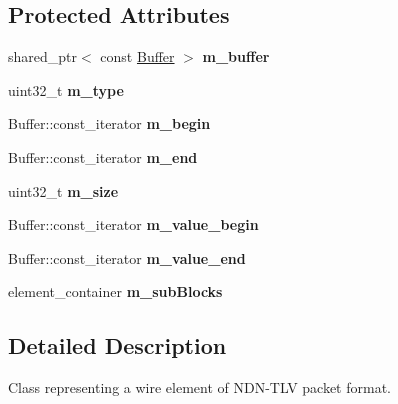 \subsection*{Protected Attributes}
\begin{DoxyCompactItemize}
\item 
shared\+\_\+ptr$<$ const \hyperlink{classndn_1_1Buffer}{Buffer} $>$ {\bfseries m\+\_\+buffer}\hypertarget{classndn_1_1Block_ac0023f090d7234a775c4302ba23de184}{}\label{classndn_1_1Block_ac0023f090d7234a775c4302ba23de184}

\item 
uint32\+\_\+t {\bfseries m\+\_\+type}\hypertarget{classndn_1_1Block_a1a4cca123da57c80b3c29f6aa0b15bd3}{}\label{classndn_1_1Block_a1a4cca123da57c80b3c29f6aa0b15bd3}

\item 
Buffer\+::const\+\_\+iterator {\bfseries m\+\_\+begin}\hypertarget{classndn_1_1Block_abc9812a66e688edf22d41b1750ac9040}{}\label{classndn_1_1Block_abc9812a66e688edf22d41b1750ac9040}

\item 
Buffer\+::const\+\_\+iterator {\bfseries m\+\_\+end}\hypertarget{classndn_1_1Block_a5c9a3a22457f887d380ae211c368b012}{}\label{classndn_1_1Block_a5c9a3a22457f887d380ae211c368b012}

\item 
uint32\+\_\+t {\bfseries m\+\_\+size}\hypertarget{classndn_1_1Block_a4f1f7e7cddf836b12d208fc04ce3d705}{}\label{classndn_1_1Block_a4f1f7e7cddf836b12d208fc04ce3d705}

\item 
Buffer\+::const\+\_\+iterator {\bfseries m\+\_\+value\+\_\+begin}\hypertarget{classndn_1_1Block_a649bfb7edd21c79e379df42a414f4845}{}\label{classndn_1_1Block_a649bfb7edd21c79e379df42a414f4845}

\item 
Buffer\+::const\+\_\+iterator {\bfseries m\+\_\+value\+\_\+end}\hypertarget{classndn_1_1Block_a686b4210558100794d093345b03c1b44}{}\label{classndn_1_1Block_a686b4210558100794d093345b03c1b44}

\item 
element\+\_\+container {\bfseries m\+\_\+sub\+Blocks}\hypertarget{classndn_1_1Block_a2abe20c179a8c13999e469497b4fb62b}{}\label{classndn_1_1Block_a2abe20c179a8c13999e469497b4fb62b}

\end{DoxyCompactItemize}


\subsection{Detailed Description}
Class representing a wire element of N\+D\+N-\/\+T\+LV packet format. 

